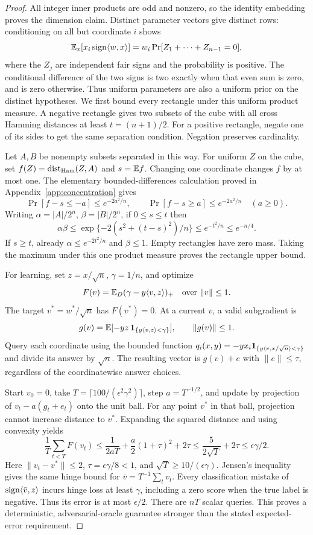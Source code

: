 \begin{proof}
All integer inner products are odd and nonzero, so the identity embedding proves the dimension claim. Distinct parameter vectors give distinct rows: conditioning on all but coordinate $i$ shows
\[
 \mathbb E_x[x_i\operatorname{sign}\langle w,x\rangle]
 =w_i\Pr[Z_1+\cdots+Z_{n-1}=0],
\]
where the $Z_j$ are independent fair signs and the probability is positive. The conditional difference of the two signs is two exactly when that even sum is zero, and is zero otherwise. Thus uniform parameters are also a uniform prior on the distinct hypotheses. We first bound every rectangle under this uniform product measure. A negative rectangle gives two subsets of the cube with all cross Hamming distances at least $t=(n+1)/2$. For a positive rectangle, negate one of its sides to get the same separation condition. Negation preserves cardinality.

Let $A,B$ be nonempty subsets separated in this way. For uniform $Z$ on the cube, set $f(Z)=\operatorname{dist}_{\rm Ham}(Z,A)$ and $s=\mathbb E f$. Changing one coordinate changes $f$ by at most one. The elementary bounded-differences calculation proved in Appendix~\ref{app:concentration} gives
\[
 \Pr[f-s\le-a]\le e^{-2a^2/n},\qquad
 \Pr[f-s\ge a]\le e^{-2a^2/n}\quad(a\ge0).
\]
Writing $\alpha=|A|/2^n$, $\beta=|B|/2^n$, if $0\le s\le t$ then
\[
 \alpha\beta\le\exp\{-2(s^2+(t-s)^2)/n\}
 \le e^{-t^2/n}\le e^{-n/4}.
\]
If $s\ge t$, already $\alpha\le e^{-2t^2/n}$ and $\beta\le1$. Empty rectangles have zero mass. Taking the maximum under this one product measure proves the rectangle upper bound.

For learning, set $z=x/\sqrt n$, $\gamma=1/n$, and optimize
\[
 F(v)=\mathbb E_D(\gamma-y\langle v,z\rangle)_+
 \quad\text{over }\|v\|\le1.
\]
The target $v^*=w^*/\sqrt n$ has $F(v^*)=0$. At a current $v$, a valid subgradient is
\[
 g(v)=\mathbb E[-yz\,\mathbf 1_{\{y\langle v,z\rangle<\gamma\}}],\qquad\|g(v)\|\le1.
\]
Query each coordinate using the bounded function
$q_i(x,y)=-yx_i\mathbf 1_{\{y\langle v,x/\sqrt n\rangle<\gamma\}}$ and divide its answer by $\sqrt n$. The resulting vector is $g(v)+e$ with $\|e\|\le\tau$, regardless of the coordinatewise answer choices.

Start $v_0=0$, take $T=\lceil100/(\epsilon^2\gamma^2)\rceil$, step $a=T^{-1/2}$, and update by projection of $v_t-a(g_t+e_t)$ onto the unit ball. For any point $v^*$ in that ball, projection cannot increase distance to $v^*$. Expanding the squared distance and using convexity yields
\[
 \frac1T\sum_{t<T}F(v_t)
 \le\frac1{2aT}+\frac a2(1+\tau)^2+2\tau
 \le\frac{5}{2\sqrt T}+2\tau
 \le\epsilon\gamma/2.
\]
Here $\|v_t-v^*\|\le2$, $\tau=\epsilon\gamma/8<1$, and $\sqrt T\ge10/(\epsilon\gamma)$. Jensen's inequality gives the same hinge bound for $\bar v=T^{-1}\sum_t v_t$. Every classification mistake of $\operatorname{sign}\langle\bar v,z\rangle$ incurs hinge loss at least $\gamma$, including a zero score when the true label is negative. Thus its error is at most $\epsilon/2$. There are $nT$ scalar queries. This proves a deterministic, adversarial-oracle guarantee stronger than the stated expected-error requirement.
\end{proof}


